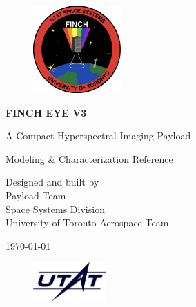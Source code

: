 \begin{titlepage}
    \begin{center}
        \vspace*{1cm}
    
        \begin{figure}[H]
        \centering
        \includegraphics[width=0.3\textwidth]{figures/logos/finch-patch.png}
        \end{figure}
    
        {\Huge\textbf{FINCH EYE V3}}
            
        \bigskip
        \bigskip
        
        {\LARGE A Compact Hyperspectral Imaging Payload}
            
        \bigskip
        \bigskip
        \bigskip
            
        {\Large Modeling \& Characterization Reference \\}

        \vfill
        
        {\normalsize Designed and built by \\
        Payload Team \\
        Space Systems Division \\
        University of Toronto Aerospace Team \\}

        \bigskip
        \bigskip
        \bigskip
            
        {\Large \today}

        \begin{figure}[H]
            \centering
            \includegraphics[trim={0 0 0 0}, clip, width=0.25\textwidth]{figures/logos/utat.png}
            \label{fig:logo} 
        \end{figure}
        
    \end{center}
\end{titlepage}

